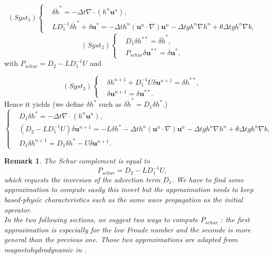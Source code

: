 \documentclass[a4paper, 11pt]{report}
\newtheorem{Remark}{Remark}
\begin{document}
\begin{equation*}
(Syst_1)\left\{\begin{split}
&\overline{\delta h}^*=-\Delta t\nabla\cdot(h^n\boldsymbol{u}^n),\\
&LD_1^{-1}\overline{\delta h}^*+\delta \boldsymbol{u}^*=-\Delta th^n\left(\boldsymbol{u}^n\cdot\nabla\right)\boldsymbol{u}^n-\Delta tgh^n\nabla h^n+\theta\Delta tgh^n\nabla b,
\end{split}\right.
\end{equation*}
\begin{equation*}
(Syst_2)\left\{\begin{split}
&D_1\delta h^{**}=\overline{\delta h}^*,\\
&P_{schur}\delta \boldsymbol{u}^{**}=\delta \boldsymbol{u}^{*},
\end{split}
\right.
\end{equation*}
with  $P_{schur}=D_2-LD_1^{-1}U$
and

\begin{equation*}
(Syst_3)\left\{\begin{split}
&\delta h^{n+1}+D_1^{-1}U\delta \boldsymbol{u}^{n+1}=\delta h^{**},\\
&\delta \boldsymbol{u}^{n+1}=\delta \boldsymbol{u}^{**}.
\end{split}\right.
\end{equation*}
Hence it yields (we define $\delta h^*$ such as $\overline{\delta h}^*=D_1\delta h^*$.)
\begin{equation*}
\left\{
\begin{split}
&D_1\delta h^{*}=-\Delta t\nabla\cdot(h^n\boldsymbol{u}^n),\\
&(D_2-LD_1^{-1}U)\delta \boldsymbol{u}^{n+1}=-L\delta h^*-\Delta th^n(\boldsymbol{u}^n\cdot\nabla)\boldsymbol{u}^n-\Delta tgh^n\nabla h^n+\theta\Delta tgh^n\nabla b,\\
&D_1\delta h^{n+1}=D_1\delta h^*-U\delta \boldsymbol{u}^{n+1}.
\end{split}\right.
\end{equation*}

\begin{Remark}
The Schur complement is equal to
\begin{equation*}
P_{schur}=D_2-LD_1^{-1}U,
\end{equation*}
which requests the inversion of the advection term $D_1$.  We have to find some approximation to compute easily this invert but the approximation needs to keep based-physic characteristics such as the same wave propagation as the initial operator. \\
In the two following sections, we suggest two ways to compute $P_{schur}$ : the first approximation is especially for the low Froude number and the seconde is more general than the previous one. Those two approximations are adapted from magnetohydrodynamic in \cite{Chacon_2008}.
\end{Remark}
\end{document}
